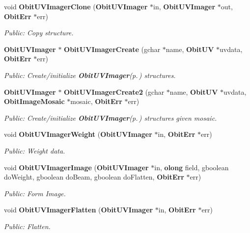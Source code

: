\begin{CompactItemize}
void {\bf Obit\-UVImager\-Clone} ({\bf Obit\-UVImager} $\ast$in, {\bf Obit\-UVImager} $\ast$out, {\bf Obit\-Err} $\ast$err)
\begin{CompactList}\small\item\em Public: Copy structure. \item\end{CompactList}\item 
{\bf Obit\-UVImager} $\ast$ {\bf Obit\-UVImager\-Create} (gchar $\ast$name, {\bf Obit\-UV} $\ast$uvdata, {\bf Obit\-Err} $\ast$err)
\begin{CompactList}\small\item\em Public: Create/initialize {\bf Obit\-UVImager}{\rm (p.\,\pageref{structObitUVImager})} structures. \item\end{CompactList}\item 
{\bf Obit\-UVImager} $\ast$ {\bf Obit\-UVImager\-Create2} (gchar $\ast$name, {\bf Obit\-UV} $\ast$uvdata, {\bf Obit\-Image\-Mosaic} $\ast$mosaic, {\bf Obit\-Err} $\ast$err)
\begin{CompactList}\small\item\em Public: Create/initialize {\bf Obit\-UVImager}{\rm (p.\,\pageref{structObitUVImager})} structures given mosaic. \item\end{CompactList}\item 
void {\bf Obit\-UVImager\-Weight} ({\bf Obit\-UVImager} $\ast$in, {\bf Obit\-Err} $\ast$err)
\begin{CompactList}\small\item\em Public: Weight data. \item\end{CompactList}\item 
void {\bf Obit\-UVImager\-Image} ({\bf Obit\-UVImager} $\ast$in, {\bf olong} field, gboolean do\-Weight, gboolean do\-Beam, gboolean do\-Flatten, {\bf Obit\-Err} $\ast$err)
\begin{CompactList}\small\item\em Public: Form Image. \item\end{CompactList}\item 
void {\bf Obit\-UVImager\-Flatten} ({\bf Obit\-UVImager} $\ast$in, {\bf Obit\-Err} $\ast$err)
\begin{CompactList}\small\item\em Public: Flatten. \item\end{CompactList}\item 

\end{CompactItemize}
